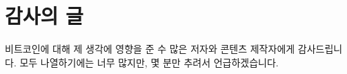 \chapter*{감사의 글}

비트코인에 대해 제 생각에 영향을 준 수 많은 저자와 콘텐츠 제작자에게 감사드립니다.
모두 나열하기에는 너무 많지만, 몇 분만 추려서 언급하겠습니다.


\begin{itemize}
\begin{comment}
  \item Thanks to Arjun Balaji for the tweet which motivated me to write this.
  \item Thanks to Marty Bent for providing endless food for thought and entertainment. If you are not subscribed to Marty’s Bent and Tales From The Crypt, you are missing out. Cheers Matt and Marty for guiding us through the rabbit hole.
  \item Thanks to Michael Goldstein and Pierre Rochard for curating and providing the greatest Bitcoin literature via the Nakamoto Institute. And thank you for creating the Noded Podcast which influenced my philosophical views on Bitcoin substantially.
  \item Thanks to Saifedean Ammous for his convictions, savage tweets, and writing The Bitcoin Standard
  \item Thanks to Francis Pouliot for sharing his excitement about finding out about the timechain.
  \item Thanks to Andreas M. Antonopoulos for all the educational material he has put out over the years.
  \item Thanks to Peter McCormack for his honest tweets and the What Bitcoin Did podcast, which keeps providing great insights from many areas of the space.
  \item Thanks to Jannik, Brandon, Matt, Camilo, Daniel, Michael, and Raphael for providing feedback to early drafts of some lessons. Special thanks to Jannik who proofread multiple drafts multiple times.
  \item Thanks to Dhruv Bansal and Matt Odell for taking the time to discuss some of these ideas with me.
  \item Thanks to Guy Swann for producing an audio version of 21lessons.com.
  \item Thanks to Friar Hass for his spiritual support and guidance, and for taking the time to write a foreword for this book.

\end{comment}
\end{itemize}
